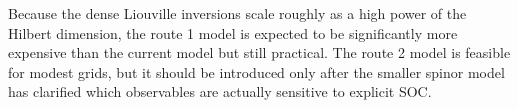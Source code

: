 \documentclass[11pt]{article}
\begin{document}
Because the dense Liouville inversions scale roughly as a high power of the Hilbert dimension, the route 1 model is expected to be significantly more expensive than the current model but still practical. The route 2 model is feasible for modest grids, but it should be introduced only after the smaller spinor model has clarified which observables are actually sensitive to explicit SOC.



\end{document}
